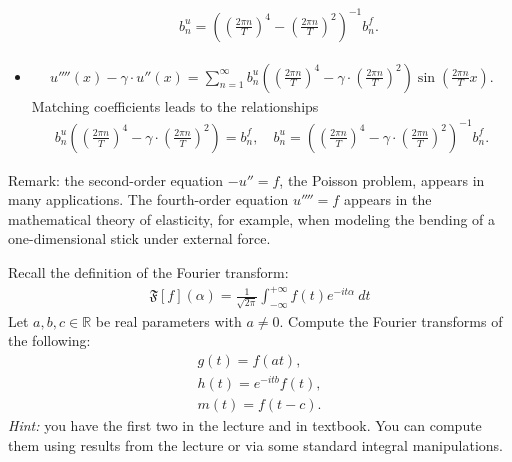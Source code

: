 \documentclass[11pt]{article}
\begin{document}
\begin{solution}
\begin{itemize}
\begin{align*}
        \quad 
        b_{n}^{u} = \left( \left( \frac{2\pi n}{T} \right)^{4} - \left( \frac{2\pi n}{T} \right)^{2} \right)^{-1} b_{n}^{f}.
     \end{align*}
     \item 
     \begin{align*}
        u''''(x) - \gamma \cdot u''(x) = \sum_{n=1}^{\infty} b_{n}^{u} \left( \left( \frac{2\pi n}{T} \right)^{4} - \gamma \cdot \left( \frac{2\pi n}{T} \right)^{2} \right) \sin\left( \frac{2\pi n}{T} x \right).
     \end{align*}
     Matching coefficients leads to the relationships
     \begin{align*}
        b_{n}^{u} \left( \left( \frac{2\pi n}{T} \right)^{4} - \gamma \cdot \left( \frac{2\pi n}{T} \right)^{2} \right) = b_{n}^{f},
        \quad 
        b_{n}^{u} = \left( \left( \frac{2\pi n}{T} \right)^{4} - \gamma \cdot \left( \frac{2\pi n}{T} \right)^{2} \right)^{-1} b_{n}^{f}.
     \end{align*}
    \end{itemize}
    Remark: the second-order equation $-u'' = f$, the Poisson problem, appears in many applications. The fourth-order equation $u'''' = f$ appears in the mathematical theory of elasticity, for example, when modeling the bending of a one-dimensional stick under external force. 
\end{solution}





\begin{exercise}
    Recall the definition of the Fourier transform:
    \begin{align}
        \mathfrak{F}[f](\alpha) = \frac{1}{\sqrt{2\pi}} \int_{-\infty}^{+\infty} f(t) e^{-it\alpha} \ dt
    \end{align}
    Let $a,b,c \in \mathbb R$ be real parameters with $a \neq 0$. Compute the Fourier transforms of the following:
    \begin{align}
        g(t) = f( a t ),
        \\
        h(t) = e^{-i t b} f(t),
        \\
        m(t) = f( t - c ).
    \end{align}
    \textit{Hint: } you have the first two in the lecture and in textbook. You can compute them using results from the lecture or via some standard integral manipulations. 
\end{exercise}
\end{document}
